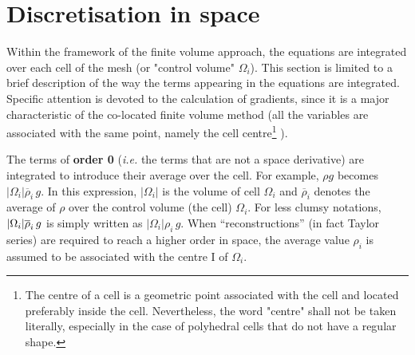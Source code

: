 
%
%
%
%


\section*{Discretisation in space}

Within the framework of the finite volume approach, the equations are
integrated over each cell of the mesh (or "control volume" $\Omega_i$). This
section is limited to a brief description of the way the terms appearing in
the equations are integrated. Specific attention is devoted to the
calculation of gradients, since it is a major characteristic of the
co-located finite volume method (all the variables are associated with the
same point, namely the cell centre\footnote{%
The centre of a cell is a geometric point associated with the cell and
located preferably inside the cell. Nevertheless, the word "centre" shall
not be taken literally,
especially in the case of polyhedral cells that do not have a regular shape.}%
).

The terms of \textbf{order 0} (\textit{i.e.} the terms that are not a space
derivative) are integrated to introduce their average over the cell. For
example, $\rho g$ becomes $|\Omega _{i}|\overline{\rho }_{i}\,g$. In this
expression, $|\Omega _{i}|$ is the volume of cell $\Omega _{i}$ and $%
\overline{\rho }_{i}$ denotes the average of $\rho $ over the control volume
(the cell) $\Omega _{i}$. For less clumsy notations, $|\Omega _{i}|\overline{%
\rho }_{i}\,g$ is simply written as $|\Omega _{i}|\rho _{i}\,g$. When
``reconstructions'' (in fact Taylor series) are required to reach a higher
order in space, the average value $\rho _{i}$ is assumed to be associated
with the centre I of $\Omega _{i}$.

